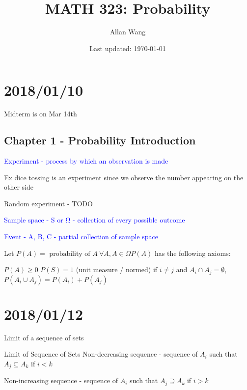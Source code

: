 \documentclass[12 pt]{article}
\author{Allan Wang}
\date{Last updated: \today}
\title{MATH 323: Probability}
\newcommand{\definition}[1]{\textcolor{blue}{#1}}
\begin{document}
		\onehalfspacing
		\maketitle
		\tableofcontents
			\section{2018/01/10}
			
			Midterm is on Mar 14th
			
			\subsection{Chapter 1 - Probability Introduction}
			
			\definition{Experiment - process by which an observation is made}
			
			Ex dice tossing is an experiment since we observe the number appearing on the other side
			
			Random experiment - TODO
			
			\definition{Sample space - S or Ω - collection of every possible outcome}
			
			\definition{Event - A, B, C - partial collection of sample space}
			
			Let $P(A) = \text{ probability of } A \ \forall A, A \in \Omega P(A)$ has the following axioms:
			
			$P(A) \ge 0$
			$P(S) = 1$ (unit measure / normed)
			if $i \ne j$ and $A_i \cap A_j = \emptyset$, $P(A_i \cup A_j) = P(A_i) + P(A_j)$
			
			\section{2018/01/12}
			Limit of a sequence of sets
			
			Limit of Sequence of Sets
			Non-decreasing sequence - sequence of $A_i$ such that $A_j \subseteq A_k$ if $i < k$
			
			Non-increasing sequence - sequence of $A_i$ such that $A_j \supseteq A_k$ if $i > k$
			
\end{document}
